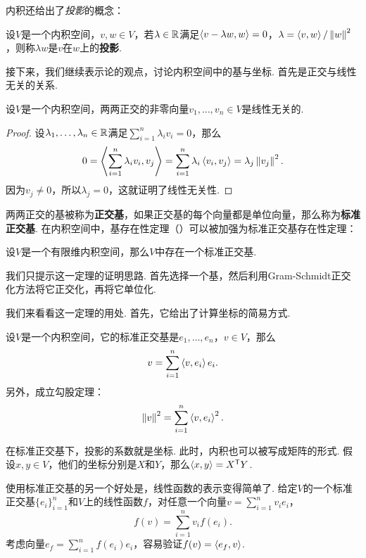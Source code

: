 内积还给出了\textit{投影}的概念：

\begin{definition}[投影]
设$V$是一个内积空间，$v,w\in V$，若$\lambda\in\mathbb{R}$满足$\left\langle{v-\lambda w},{w}\right\rangle=0$，$\lambda=\left\langle{v},{w}\right\rangle/\left\|w\right\|^2$，则称$\lambda w$是$v$在$w$上的\textbf{投影}. 
\end{definition}

接下来，我们继续表示论的观点，讨论内积空间中的基与坐标. 首先是正交与线性无关的关系. 

\begin{proposition}\label{proposition:orthogonal}
设$V$是一个内积空间，两两正交的非零向量$v_1,\dots,v_n\in V$是线性无关的. 
\end{proposition}
\begin{proof}
设$\lambda_1,\dots,\lambda_n\in\mathbb{R}$满足$\sum_{i=1}^n\lambda_iv_i=0$，那么
\[
    0=\left\langle{\sum_{i=1}^n\lambda_iv_i},{v_j}\right\rangle=\sum_{i=1}^n\lambda_i\left\langle{v_i},{v_j}\right\rangle=\lambda_j\left\|v_j\right\|^2.
\]
因为$v_j\neq 0$，所以$\lambda_j=0$，这就证明了线性无关性. 
\end{proof}

两两正交的基被称为\textbf{正交基}，如果正交基的每个向量都是单位向量，那么称为\textbf{标准正交基}. 在内积空间中，基存在性定理（）可以被加强为标准正交基存在性定理：

\begin{theorem}[标准正交基存在性定理]\label{theorem:orthogonal-basis}
设$V$是一个有限维内积空间，那么$V$中存在一个标准正交基. 
\end{theorem}

我们只提示这一定理的证明思路. 首先选择一个基，然后利用Gram-Schmidt正交化方法将它正交化，再将它单位化. 

我们来看看这一定理的用处. 首先，它给出了计算坐标的简易方式. 

\begin{proposition}\label{proposition:projection}
设$V$是一个内积空间，它的标准正交基是$e_1,\dots,e_n$，$v\in V$，那么
\[
    v=\sum_{i=1}^n\left\langle{v},{e_i}\right\rangle e_i.
\]
另外，成立勾股定理：
\[
    \left\|v\right\|^2=\sum_{i=1}^n\left\langle{v},{e_i}\right\rangle^2.
\]
\end{proposition}

在标准正交基下，投影的系数就是坐标. 此时，内积也可以被写成矩阵的形式. 假设$x,y\in V$，他们的坐标分别是$X$和$Y$，那么$\left\langle{x},{y}\right\rangle=X^{\mathsf{T}} Y$.

使用标准正交基的另一个好处是，线性函数的表示变得简单了. 给定$V$的一个标准正交基$\{e_i\}_{i=1}^n$和$V$上的线性函数$f$，对任意一个向量$v=\sum_{i=1}^nv_ie_i$，
\[f(v)=\sum_{i=1}^nv_if(e_i).\]
考虑向量$e_f=\sum_{i=1}^nf(e_i)e_i$，容易验证$f(v)=\left\langle{e_f},{v}\right\rangle$. 

